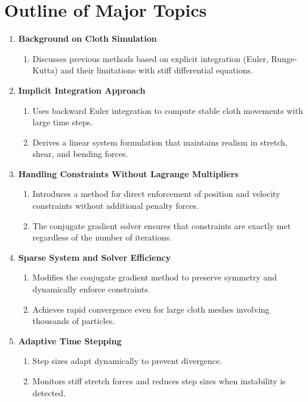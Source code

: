 \documentclass[12pt]{article}
\begin{document}
\section{Outline of Major Topics}
\begin{enumerate}[noitemsep]
    \item \textbf{Background on Cloth Simulation}
    \begin{enumerate}[noitemsep]
         \item Discusses previous methods based on explicit integration (Euler, Runge-Kutta) and their limitations with stiff differential equations.
    \end{enumerate}
    \item \textbf{Implicit Integration Approach}
    \begin{enumerate}[noitemsep]
         \item Uses backward Euler integration to compute stable cloth movements with large time steps.
         \item Derives a linear system formulation that maintains realism in stretch, shear, and bending forces.
    \end{enumerate}
    \item \textbf{Handling Constraints Without Lagrange Multipliers}
    \begin{enumerate}[noitemsep]
         \item Introduces a method for direct enforcement of position and velocity constraints without additional penalty forces.
         \item The conjugate gradient solver ensures that constraints are exactly met regardless of the number of iterations.
    \end{enumerate}
    \item \textbf{Sparse System and Solver Efficiency}
    \begin{enumerate}[noitemsep]
         \item Modifies the conjugate gradient method to preserve symmetry and dynamically enforce constraints.
         \item Achieves rapid convergence even for large cloth meshes involving thousands of particles.
    \end{enumerate}
    \item \textbf{Adaptive Time Stepping}
    \begin{enumerate}[noitemsep]
         \item Step sizes adapt dynamically to prevent divergence.
         \item Monitors stiff stretch forces and reduces step sizes when instability is detected.

\end{enumerate}
\end{enumerate}
\end{document}
